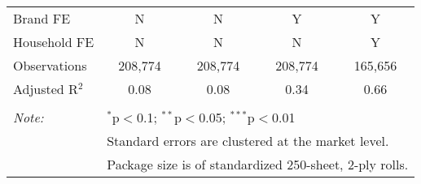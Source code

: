 \begin{table}[!htbp]
\begin{tabular}{@{\extracolsep{5pt}}lcccc}
Brand FE & N & N & Y & Y \\ 
Household FE & N & N & N & Y \\ 
Observations & 208,774 & 208,774 & 208,774 & 165,656 \\ 
Adjusted R$^{2}$ & 0.08 & 0.08 & 0.34 & 0.66 \\ 
\hline 
\hline \\[-1.8ex] 
\textit{Note:}  & \multicolumn{4}{l}{$^{*}$p$<$0.1; $^{**}$p$<$0.05; $^{***}$p$<$0.01} \\ 
 & \multicolumn{4}{l}{Standard errors are clustered at the market level.} \\ 
 & \multicolumn{4}{l}{Package size is of standardized 250-sheet, 2-ply rolls.} \\ 
\end{tabular} 
\end{table} 
